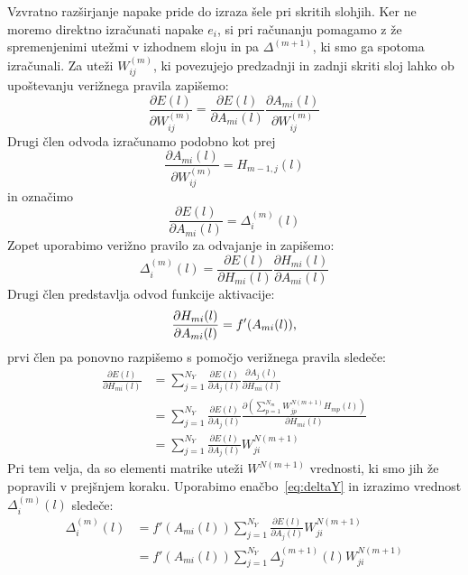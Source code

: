 \documentclass[mat1]{fmfdelo}
\begin{document}
Vzvratno razširjanje napake pride do izraza šele pri skritih slohjih. Ker ne moremo direktno izračunati napake $e_i$, si pri računanju pomagamo z že spremenjenimi utežmi v izhodnem sloju in pa $\Delta^{(m+1)}$, ki smo ga spotoma izračunali. Za uteži $W^{(m)}_{ij}$, ki povezujejo predzadnji in zadnji skriti sloj lahko ob upoštevanju verižnega pravila zapišemo:
%
\begin{equation*}
 \frac{\partial E(l)}{\partial W^{(m)}_{ij}} = \frac{\partial E(l)}{\partial A_{mi}(l)} \frac{\partial A_{mi}(l)}{\partial W^{(m)}_{ij}}
\end{equation*}
%
Drugi člen odvoda izračunamo podobno kot prej
\begin{equation*}
\frac{\partial A_{mi}(l)}{\partial W^{(m)}_{ij}} = H_{m-1,j}(l)
\end{equation*}
%
in označimo
%
\begin{equation*}
\frac{\partial E(l)}{\partial A_{mi}(l)} = \Delta^{(m)}_i(l)
\end{equation*}
%
Zopet uporabimo verižno pravilo za odvajanje in zapišemo:
%
\begin{equation*}
\Delta^{(m)}_i(l) = \frac{\partial E(l)}{\partial H_{mi}(l)}\frac{\partial H_{mi}(l)}{\partial A_{mi}(l)}
\end{equation*}
%
Drugi člen predstavlja odvod funkcije aktivacije:
%
\begin{equation*}
\frac{\partial H_{mi}(l)}{\partial A_{mi}(l)} =  f'(A_{mi}(l)) \text,
\end{equation*}
%
prvi člen pa ponovno razpišemo s pomočjo verižnega pravila sledeče:
%
\begin{equation*}
\begin{aligned}
\frac{\partial E(l)}{\partial H_{mi}(l)} &=  \sum^{N_Y}_{j=1} \frac{\partial E(l)}{\partial A_j(l)}\frac{\partial A_j(l)}{\partial H_{mi}(l)}  \\
& =   \sum^{N_Y}_{j=1} \frac{\partial E(l)}{\partial A_j(l)}\frac{\partial(\sum^{N_m}_{p=1} W^{N (m+1)}_{jp}H_{mp}(l))}{\partial H_{mi}(l)} \\
&= \sum^{N_Y}_{j=1} \frac{\partial E(l)}{\partial A_j(l)} W^{N (m+1)}_{ji}
\end{aligned}
\end{equation*}
%
Pri tem velja, da so elementi matrike uteži $W^{N(m+1)}$ vrednosti, ki smo jih že popravili v prejšnjem koraku. Uporabimo enačbo~\eqref{eq:deltaY} in izrazimo vrednost $\Delta^{(m)}_i(l)$ sledeče:
%
\begin{equation*}
\begin{aligned}
\Delta^{(m)}_i(l) &= f'(A_{mi}(l))  \sum^{N_Y}_{j=1} \frac{\partial E(l)}{\partial A_j(l)} W^{N (m+1)}_{ji} \\
&= f'(A_{mi}(l))  \sum^{N_Y}_{j=1} \Delta ^{(m+1)}_j(l)W^{N (m+1)}_{ji}
\end{aligned}
\end{equation*}
\end{document}
